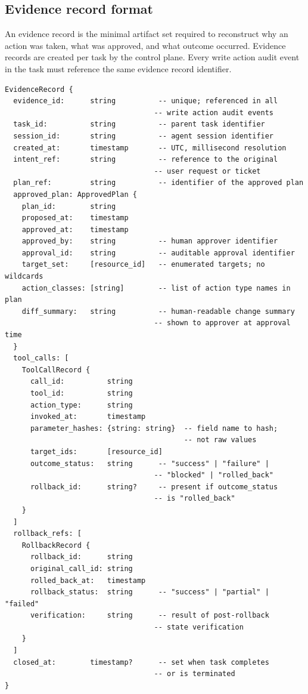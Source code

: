 \documentclass[11pt]{article}
\begin{document}
\subsection{Evidence record format}
An evidence record is the minimal artifact set required to reconstruct why an action was taken, what was approved, and what outcome occurred. Evidence records are created per task by the control plane. Every write action audit event in the task must reference the same evidence record identifier.

\begin{verbatim}
EvidenceRecord {
  evidence_id:      string          -- unique; referenced in all
                                   -- write action audit events
  task_id:          string          -- parent task identifier
  session_id:       string          -- agent session identifier
  created_at:       timestamp       -- UTC, millisecond resolution
  intent_ref:       string          -- reference to the original
                                   -- user request or ticket
  plan_ref:         string          -- identifier of the approved plan
  approved_plan: ApprovedPlan {
    plan_id:        string
    proposed_at:    timestamp
    approved_at:    timestamp
    approved_by:    string          -- human approver identifier
    approval_id:    string          -- auditable approval identifier
    target_set:     [resource_id]   -- enumerated targets; no wildcards
    action_classes: [string]        -- list of action type names in plan
    diff_summary:   string          -- human-readable change summary
                                   -- shown to approver at approval time
  }
  tool_calls: [
    ToolCallRecord {
      call_id:          string
      tool_id:          string
      action_type:      string
      invoked_at:       timestamp
      parameter_hashes: {string: string}  -- field name to hash;
                                          -- not raw values
      target_ids:       [resource_id]
      outcome_status:   string      -- "success" | "failure" |
                                   -- "blocked" | "rolled_back"
      rollback_id:      string?     -- present if outcome_status
                                   -- is "rolled_back"
    }
  ]
  rollback_refs: [
    RollbackRecord {
      rollback_id:      string
      original_call_id: string
      rolled_back_at:   timestamp
      rollback_status:  string      -- "success" | "partial" | "failed"
      verification:     string      -- result of post-rollback
                                   -- state verification
    }
  ]
  closed_at:        timestamp?      -- set when task completes
                                   -- or is terminated
}
\end{verbatim}
\end{document}
